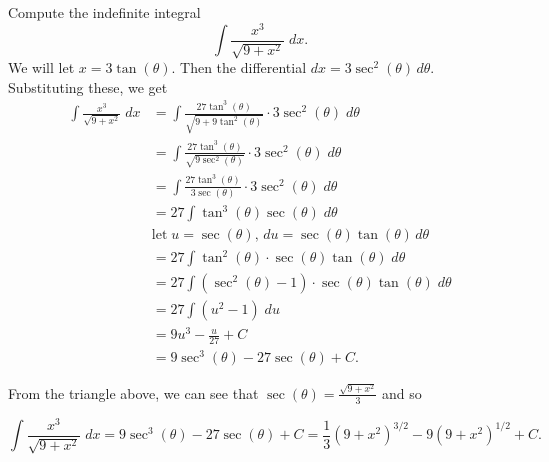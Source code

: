 \documentclass[handout]{ximera}
\begin{document}
\begin{example}[example 10]
Compute the indefinite integral
\[
\int \frac{x^3}{\sqrt{9 + x^2}} \; dx.
\]
We will let $x = 3\tan(\theta)$. Then the differential
$dx = 3\sec^2(\theta) \, d\theta$.  Substituting these, we get
\begin{align*}
\int \frac{x^3}{\sqrt{9 + x^2}} \; dx &= \int \frac{27\tan^3(\theta)}{\sqrt{9 + 9\tan^2(\theta)}} \cdot 3\sec^2(\theta) \; d\theta\\[6pt]
                                      &= \int \frac{27\tan^3(\theta)}{\sqrt{9\sec^2(\theta)}} \cdot 3\sec^2(\theta) \; d\theta\\[6pt]
                                      &= \int \frac{27\tan^3(\theta)}{3\sec(\theta)} \cdot 3\sec^2(\theta) \; d\theta\\[6pt]
                                      &= 27\int \tan^3(\theta) \sec(\theta) \; d\theta\\[6pt]
                                      & \text{let} \; u = \sec(\theta), \, du = \sec(\theta) \tan(\theta) \, d\theta\\[6pt]
                                      &= 27\int \tan^2(\theta) \cdot \sec(\theta) \tan(\theta) \; d\theta\\[6pt]
                                      &= 27\int \left(\sec^2(\theta)-1\right) \cdot \sec(\theta) \tan(\theta) \; d\theta\\[6pt]
                                      &= 27\int (u^2-1) \; du\\[6pt]
                                      &= 9u^3 - \frac{u}{27} + C\\[6pt]
                                      &= 9\sec^3(\theta) - 27 \sec(\theta) + C.
\end{align*}



\begin{image}
\end{image}



From the triangle above, we can see that $\sec(\theta) = \frac{\sqrt{9+x^2}}{3}$ and so

\[
\int \frac{x^3}{\sqrt{9 + x^2}} \; dx = 9\sec^3(\theta) - 27 \sec(\theta) + C = \frac13 (9+x^2)^{3/2} - 9(9+x^2)^{1/2} + C.
\]
\end{example}
\end{document}
